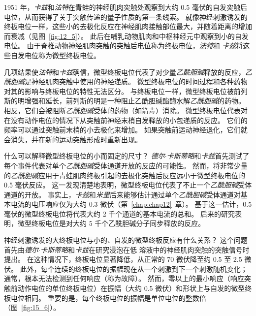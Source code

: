 1951 年，\textit{卡兹}和\textit{法特}在青蛙的神经肌肉突触处观察到大约 0.5 毫伏的自发突触后电位，从而获得了关于突触传递的量子性质的第一条线索。
就像神经刺激诱发的终板电位一样，这些小的去极化反应在神经肌肉接触部位最大，并随着距离的增加而衰减（见图~\ref{fig:12_5}）。
此后在哺乳动物肌肉和中枢神经元中观察到小的自发电位。
由于脊椎动物神经肌肉突触的突触后电位称为终板电位，\textit{法特}和 \textit{卡兹}将这些自发电位称为微型终板电位。


几项结果使\textit{法特}和\textit{卡兹}确信，微型终板电位代表了对少量\textit{乙酰胆碱}释放的反应，\textit{乙酰胆碱}是神经肌肉突触中使用的神经递质。
微型终板电位的时间过程和各种药物对其的影响与终板电位的特性无法区分。
与终板电位一样，微型终板电位被前列斯的明增强和延长，前列斯的明是一种阻止乙酰胆碱酯酶水解\textit{乙酰胆碱}的药物。
相反，它们会被阻断\textit{乙酰胆碱}受体的药物（如箭毒）消除。 
微型终板电位代表对在没有动作电位的情况下从突触前神经末梢自发释放的小包递质的反应。
它们的频率可以通过突触前末梢的小去极化来增加。
如果突触前运动神经退化，它们就会消失，并在新的运动突触形成时重新出现。


什么可以解释微型终板电位的小而固定的尺寸？
\textit{德尔$\cdot$卡斯蒂略}和\textit{卡兹}首先测试了每个事件代表对单个\textit{乙酰胆碱}受体通道开放的反应的可能性。
然而，将非常少量的\textit{乙酰胆碱}应用于青蛙肌肉终板引起的去极化突触后反应远小于微型终板电位的 0.5 毫伏反应。 
这一发现清楚地表明，微型终板电位代表了不止一个\textit{乙酰胆碱}受体通道的开放。
事实上，\textit{卡兹}和\textit{米里}后来能够估计通过单个\textit{乙酰胆碱}受体通道对基本电流的电压响应仅为大约 0.3 微伏（第~\ref{chap:chap12}~章）。
基于这一估计，0.5 毫伏的微型终板电位将代表大约 2 千个通道的基本电流的总和。
后来的研究表明，微型终板电位是对大约 5 千个乙酰胆碱分子同步释放的反应。


神经刺激诱发的大终板电位与小的、自发的微型终板反应有什么关系？
这个问题首先由\textit{德尔$\cdot$卡斯蒂略}和\textit{卡兹}在研究浸泡在低  溶液中的神经肌肉突触的突触信号时提出。
在这种情况下，终板电位显著降低，从正常的 70 微伏降至约 0.5 至 2.5 微伏。
此外，每个连续的终板电位的振幅现在从一个刺激到下一个刺激随机变化；
通常，根本无法检测到任何响应（称为故障）。
然而，零以上的最小响应（响应突触前动作电位的单位终板电位）在振幅（大约 0.5 微伏）和形状上与自发的微型终板电位相同。
重要的是，每个终板电位的振幅是单位电位的整数倍（图~\ref{fig:15_6}）。



